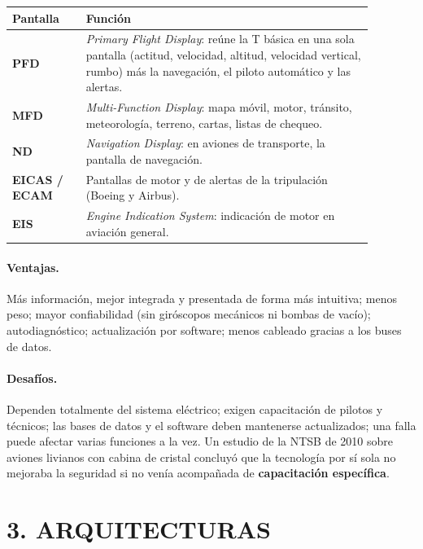\begin{center}
\small
\begin{tabular}{|p{0.18\linewidth}|p{0.70\linewidth}|}
\hline
\textbf{Pantalla} & \textbf{Función} \\ \hline
\textbf{PFD} & \textit{Primary Flight Display}: reúne la T básica en una sola pantalla (actitud,
velocidad, altitud, velocidad vertical, rumbo) más la navegación, el piloto automático y las
alertas. \\ \hline
\textbf{MFD} & \textit{Multi-Function Display}: mapa móvil, motor, tránsito, meteorología, terreno,
cartas, listas de chequeo. \\ \hline
\textbf{ND} & \textit{Navigation Display}: en aviones de transporte, la pantalla de navegación. \\
\hline
\textbf{EICAS / ECAM} & Pantallas de motor y de alertas de la tripulación (Boeing y Airbus). \\
\hline
\textbf{EIS} & \textit{Engine Indication System}: indicación de motor en aviación general. \\
\hline
\end{tabular}
\end{center}

\paragraph*{Ventajas.} Más información, mejor integrada y presentada de forma más intuitiva;
menos peso; mayor confiabilidad (sin giróscopos mecánicos ni bombas de vacío); autodiagnóstico;
actualización por software; menos cableado gracias a los buses de datos.

\paragraph*{Desafíos.} Dependen totalmente del sistema eléctrico; exigen capacitación de pilotos y
técnicos; las bases de datos y el software deben mantenerse actualizados; una falla puede afectar
varias funciones a la vez. Un estudio de la NTSB de 2010 sobre aviones livianos con cabina de
cristal concluyó que la tecnología por sí sola no mejoraba la seguridad si no venía acompañada de
\textbf{capacitación específica}.

\section*{3. ARQUITECTURAS}

